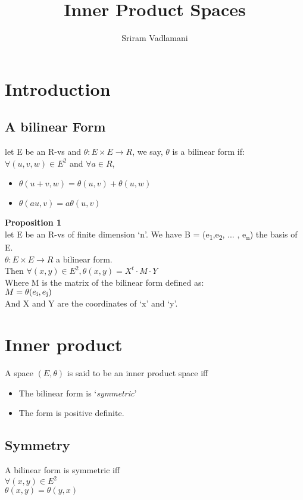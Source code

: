 \documentclass{article}
\author{Sriram Vadlamani}
\title{Inner Product Spaces}
\begin{document}
\maketitle
\newpage
\tableofcontents
\newpage
\section{Introduction}
\subsection{A bilinear Form}
let E be an R-vs and $\theta: E \times E \rightarrow R$, 
we say, $\theta$ is a bilinear form if:\\
$\forall (u,v,w) \in E^2$ and $\forall a \in R$, 
\begin{itemize}
    \item $\theta (u + v, w) = \theta(u,v) + \theta(u,w)$
    \item $\theta (au, v) = a\theta(u,v)$
\end{itemize}
\textbf{Proposition 1}\\
let E be an R-vs of finite dimension `n'. We have B = (e\textsubscript{1},e\textsubscript{2}, ... , e\textsubscript{n}) the basis of E.\\
$\theta: E \times E \rightarrow R $ a bilinear form.\\
Then $\forall (x,y) \in E^2, \theta(x,y) = X^t \cdot M \cdot Y$\\
Where M is the matrix of the bilinear form defined as:\\
$M = \theta(e\textsubscript{i}, e\textsubscript{j})$\\
And X and Y are the coordinates of `x' and `y'.\\
\section{Inner product}
A space $(E, \theta)$ is said to be an inner product space iff\\ 
\begin{itemize}
    \item The bilinear form is `\textit{symmetric}'
    \item The form is positive definite.
\end{itemize}
\subsection{Symmetry}
A bilinear form is symmetric iff\\
$\forall (x,y) \in E^2$\\
$\theta(x,y) = \theta(y,x)$
\end{document}
